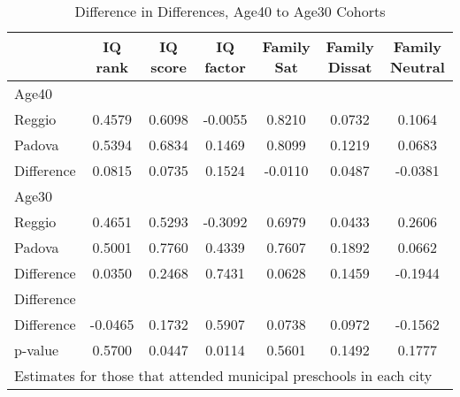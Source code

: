 \begin{table}[htbp]\centering
\caption{Difference in Differences, Age40 to Age30 Cohorts}
\begin{tabular}{l*{6}{c}}
\hline\hline
            &     IQ rank&    IQ score&   IQ factor&  Family Sat&Family Dissat&Family Neutral\\
\hline
Age40       &            &            &            &            &            &            \\
Reggio      &      0.4579&      0.6098&     -0.0055&      0.8210&      0.0732&      0.1064\\
Padova      &      0.5394&      0.6834&      0.1469&      0.8099&      0.1219&      0.0683\\
Difference  &      0.0815&      0.0735&      0.1524&     -0.0110&      0.0487&     -0.0381\\
\hline
Age30       &            &            &            &            &            &            \\
Reggio      &      0.4651&      0.5293&     -0.3092&      0.6979&      0.0433&      0.2606\\
Padova      &      0.5001&      0.7760&      0.4339&      0.7607&      0.1892&      0.0662\\
Difference  &      0.0350&      0.2468&      0.7431&      0.0628&      0.1459&     -0.1944\\
\hline
Difference  &            &            &            &            &            &            \\
Difference  &     -0.0465&      0.1732&      0.5907&      0.0738&      0.0972&     -0.1562\\
p-value     &      0.5700&      0.0447&      0.0114&      0.5601&      0.1492&      0.1777\\
\hline\hline
\multicolumn{7}{l}{\footnotesize Estimates for those that attended municipal preschools in each city}\\
\end{tabular}
\end{table}
